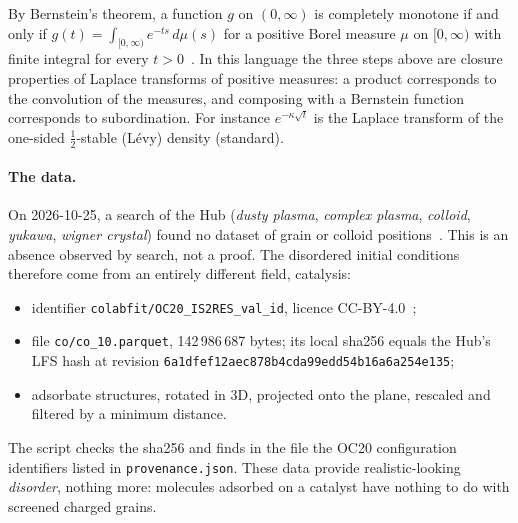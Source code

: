 \begin{uniremark}\tierL{} By Bernstein's theorem, a function $g$ on $(0,\infty)$ is completely monotone if and only if
$g(t)=\int_{[0,\infty)}e^{-ts}\,d\mu(s)$ for a positive Borel measure $\mu$ on $[0,\infty)$ with finite integral for every $t>0$~\cite{bernstein,widder}. In this language
the three steps above are closure properties of Laplace transforms of positive measures: a product corresponds to the
convolution of the measures, and composing with a Bernstein function corresponds to subordination. For instance
$e^{-\kappa\sqrt t}$ is the Laplace transform of the one-sided $\tfrac12$-stable (Lévy) density (standard).
\end{uniremark}

\paragraph{The data.} On 2026-10-25, a search of the Hub (\emph{dusty plasma}, \emph{complex plasma},
\emph{colloid}, \emph{yukawa}, \emph{wigner crystal}) found no dataset of grain or colloid
positions~\cite{ch2yuk}. This is an absence observed by search, not a proof. The disordered
initial conditions therefore come from an entirely different field, catalysis:
\begin{itemize}
\item identifier \texttt{colabfit/OC20\_IS2RES\_val\_id}, licence CC-BY-4.0~\cite{ch5:oc20};
\item file \texttt{co/co\_10.parquet}, 142\,986\,687 bytes; its local sha256 equals the Hub's LFS hash at
revision \texttt{6a1dfef12aec878b4cda99edd54b16a6a254e135};
\item adsorbate structures, rotated in 3D, projected onto the plane, rescaled and filtered by a
minimum distance.
\end{itemize}
The script checks the sha256 and finds in the file the OC20 configuration identifiers listed in
\texttt{provenance.json}. These data provide realistic-looking \emph{disorder}, nothing more: molecules
adsorbed on a catalyst have nothing to do with screened charged grains.

